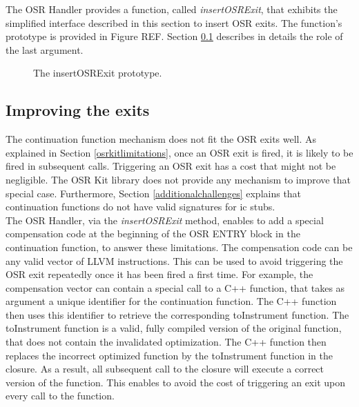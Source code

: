 The OSR Handler provides a function, called \textit{insertOSRExit}, that exhibits the simplified interface described in this section to insert OSR exits.
The function's prototype is provided in Figure REF.
Section \ref{improvingexits} describes in details the role of the last argument.\\

\begin{figure}[h]
\caption{The insertOSRExit prototype.}
\label{fig:insertoserexit}
\end{figure}

\subsection{Improving the exits}\label{improvingexits}

The continuation function mechanism does not fit the OSR exits well.
As explained in Section \ref{osrkitlimitations}, once an OSR exit is fired, it is likely to be fired in subsequent calls.
Triggering an OSR exit has a cost that might not be negligible.
The OSR Kit\cite{OSRKit} library does not provide any mechanism to improve that special case.
Furthermore, Section \ref{additionalchallenges} explains that continuation functions do not have valid signatures for ic stubs.\\

The OSR Handler, via the \textit{insertOSRExit} method, enables to add a special compensation code at the beginning of the OSR ENTRY block in the continuation function, to answer these limitations.
The compensation code can be any valid vector of LLVM instructions.
This can be used to avoid triggering the OSR exit repeatedly once it has been fired a first time.
For example, the compensation vector can contain a special call to a C++ function, that takes as argument a unique identifier for the continuation function. 
The C++ function then uses this identifier to retrieve the corresponding toInstrument function.
The toInstrument function is a valid, fully compiled version of the original function, that does not contain the invalidated optimization.
The C++ function then replaces the incorrect optimized function by the toInstrument function in the closure.
As a result, all subsequent call to the closure will execute a correct version of the function.
This enables to avoid the cost of triggering an exit upon every call to the function.\\


